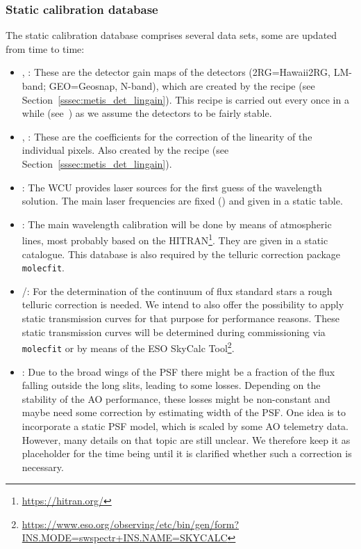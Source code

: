 \subsubsection{Static calibration database}\label{lss:static_calib}
The static calibration database comprises several data sets, some are updated from time to time:
\begin{itemize}
    \item {}, : These are the detector gain maps of the detectors (2RG=Hawaii2RG, LM-band; GEO=Geosnap, N-band), which are created by the recipe  (see Section~\ref{sssec:metis_det_lingain}). This recipe is carried out every once in a while (see~\cite{METIS-calibration_plan}) as we assume the detectors to be fairly stable.
    \item {}, : These are the coefficients for the correction of the linearity of the individual pixels. Also created by the recipe  (see Section~\ref{sssec:metis_det_lingain}).
    \item {}: The \ac{WCU} provides laser sources for the first guess of the wavelength solution. The main laser frequencies are fixed (\cite{METIS-calibration_plan}) and given in a static table.
    \item {}: The main wavelength calibration will be done by means of atmospheric lines, most probably based on the \ac{HITRAN}\footnote{\url{https://hitran.org/}}. They are given in a static catalogue. This database is also required by the telluric correction package \texttt{molecfit}.
    \item {}/: For the determination of the continuum of flux standard stars a rough telluric correction is needed. We intend to also offer the possibility to apply static transmission curves for that purpose for performance reasons. These static transmission curves will be determined during commissioning via \texttt{molecfit} or by means of the ESO SkyCalc Tool\footnote{\url{https://www.eso.org/observing/etc/bin/gen/form?INS.MODE=swspectr+INS.NAME=SKYCALC}}.
    \item {}: Due to the broad wings of the \ac{PSF} there might be a fraction of the flux falling outside the long slits, leading to some losses. Depending on the stability of the \ac{AO} performance, these losses might be non-constant and maybe need some correction by estimating width of the \ac{PSF}. One idea is to incorporate a static \ac{PSF} model, which is scaled by some \ac{AO} telemetry data. However, many details on that topic are still unclear. We therefore keep it as placeholder for the time being until it is clarified whether such a correction is necessary.

\end{itemize}
